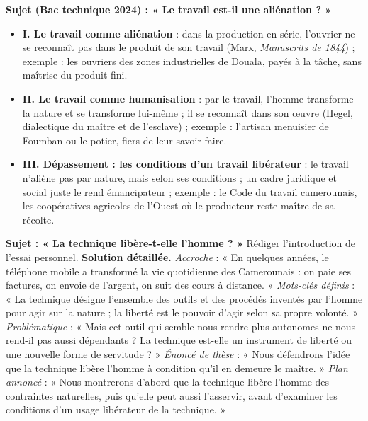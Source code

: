 \documentclass[11pt]{article}
\begin{document}
\begin{exemplebox}
\textbf{Sujet (Bac technique 2024) : « Le travail est-il une aliénation ? »}
\begin{itemize}
\item \textbf{I. Le travail comme aliénation} : dans la production en série, l'ouvrier ne se reconnaît pas dans le produit de son travail (Marx, \emph{Manuscrits de 1844}) ; exemple : les ouvriers des zones industrielles de Douala, payés à la tâche, sans maîtrise du produit fini.
\item \textbf{II. Le travail comme humanisation} : par le travail, l'homme transforme la nature et se transforme lui-même ; il se reconnaît dans son œuvre (Hegel, dialectique du maître et de l'esclave) ; exemple : l'artisan menuisier de Foumban ou le potier, fiers de leur savoir-faire.
\item \textbf{III. Dépassement : les conditions d'un travail libérateur} : le travail n'aliène pas par nature, mais selon ses conditions ; un cadre juridique et social juste le rend émancipateur ; exemple : le Code du travail camerounais, les coopératives agricoles de l'Ouest où le producteur reste maître de sa récolte.
\end{itemize}
\end{exemplebox}

\begin{exoresolu}
\textbf{Sujet : « La technique libère-t-elle l'homme ? »} Rédiger l'introduction de l'essai personnel.
\tcblower
\textbf{Solution détaillée.}
\emph{Accroche} : « En quelques années, le téléphone mobile a transformé la vie quotidienne des Camerounais : on paie ses factures, on envoie de l'argent, on suit des cours à distance. »
\emph{Mots-clés définis} : « La technique désigne l'ensemble des outils et des procédés inventés par l'homme pour agir sur la nature ; la liberté est le pouvoir d'agir selon sa propre volonté. »
\emph{Problématique} : « Mais cet outil qui semble nous rendre plus autonomes ne nous rend-il pas aussi dépendants ? La technique est-elle un instrument de liberté ou une nouvelle forme de servitude ? »
\emph{Énoncé de thèse} : « Nous défendrons l'idée que la technique libère l'homme à condition qu'il en demeure le maître. »
\emph{Plan annoncé} : « Nous montrerons d'abord que la technique libère l'homme des contraintes naturelles, puis qu'elle peut aussi l'asservir, avant d'examiner les conditions d'un usage libérateur de la technique. »
\end{exoresolu}
\end{document}
